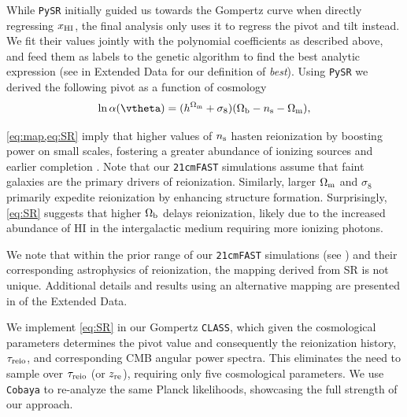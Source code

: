While \texttt{PySR} initially guided us towards the Gompertz curve when
directly regressing $x_{\mathrm{HI}}$, the final analysis only uses it to regress
the pivot and tilt instead.
We fit their values jointly with the polynomial coefficients as
described above, and feed them as labels to the genetic algorithm to
find the best analytic expression (see  in Extended
Data for our definition of \emph{best}).
Using \texttt{PySR} we derived the following pivot as a function of
cosmology
%
\begin{equation}
\label{eq:SR}
\ln\ap(\vtheta) = (h^{\Omegam} + \sigma_8) (\Omegab - \ns - \Omegam),
\end{equation}

\cref{eq:map,eq:SR} imply that higher values of $n_\mathrm{s}$ hasten
reionization by boosting power on small scales, fostering a greater
abundance of ionizing sources and earlier completion \cite{Montero2021}.
Note that our \texttt{21cmFAST} simulations assume that faint galaxies
are the primary drivers of reionization.
Similarly, larger $\Omega_\mathrm{m}$ and $\sigma_8$ primarily expedite
reionization by enhancing structure formation.
Surprisingly, \cref{eq:SR} suggests that higher $\Omega_\mathrm{b}$ delays
reionization, likely due to the increased abundance of HI in the
intergalactic medium requiring more ionizing photons.

We note that within the prior range of our \texttt{21cmFAST} simulations
(see ) and their corresponding astrophysics of
reionization, the mapping derived from SR is not unique.
Additional details and results using an alternative mapping are
presented in  of the Extended Data.

We implement \cref{eq:SR} in our Gompertz \texttt{CLASS}, which given
the cosmological parameters determines the pivot value and consequently
the reionization history, $\tau_{\mathrm{reio}}$, and corresponding CMB angular
power spectra.
This eliminates the need to sample over $\tau_{\mathrm{reio}}$ (or $z_{\mathrm{re}}$),
requiring only five cosmological parameters.
We use \texttt{Cobaya} to re-analyze the same Planck likelihoods,
showcasing the full strength of our approach.

